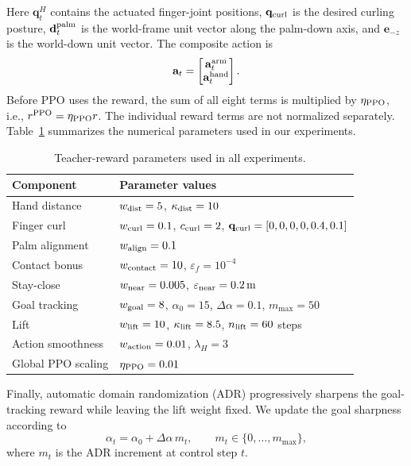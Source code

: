 Here $\mathbf q_t^H$ contains the actuated finger-joint positions,
$\mathbf q_{\rm curl}$ is the desired curling posture,
$\mathbf d_t^{\rm palm}$ is the world-frame unit vector along the palm-down
axis, and $\mathbf e_{-z}$ is the world-down unit vector.  The composite action
is
\begin{equation}
\mathbf a_t=
\begin{bmatrix}\mathbf a_t^{\rm arm}\\ \mathbf a_t^{\rm hand}\end{bmatrix}.
\label{eq:teacher_action_definition}
\end{equation}
Before PPO uses the reward, the sum of all eight terms is multiplied by
$\eta_{\rm PPO}$, i.e., $r^{\rm PPO}=\eta_{\rm PPO}r$. The individual reward
terms are not normalized separately. Table~\ref{tab:teacher_reward_parameters}
summarizes the numerical parameters used in our experiments.

\begin{table}[H]
\centering
\caption{Teacher-reward parameters used in all experiments.}
\label{tab:teacher_reward_parameters}
\renewcommand{\arraystretch}{1.08}
\begin{tabularx}{\textwidth}{@{}lX@{}}
\toprule
Component & Parameter values \\
\midrule
Hand distance & $w_{\rm dist}=5$, $\kappa_{\rm dist}=10$ \\
Finger curl & $w_{\rm curl}=0.1$, $c_{\rm curl}=2$,
$\mathbf q_{\rm curl}=[0,0,0,0,0.4,0.1]$ \\
Palm alignment & $w_{\rm align}=0.1$ \\
Contact bonus & $w_{\rm contact}=10$, $\varepsilon_f=10^{-4}$ \\
Stay-close & $w_{\rm near}=0.005$, $\varepsilon_{\rm near}=0.2\,\mathrm{m}$ \\
Goal tracking & $w_{\rm goal}=8$, $\alpha_0=15$,
$\Delta\alpha=0.1$, $m_{\max}=50$ \\
Lift & $w_{\rm lift}=10$, $\kappa_{\rm lift}=8.5$,
$n_{\rm lift}=60$ steps \\
Action smoothness & $w_{\rm action}=0.01$, $\lambda_H=3$ \\
Global PPO scaling & $\eta_{\rm PPO}=0.01$ \\
\bottomrule
\end{tabularx}
\end{table}

Finally, automatic domain randomization (ADR) progressively sharpens the
goal-tracking reward while leaving the lift weight fixed.  We update the goal
sharpness according to
\begin{equation}
\alpha_t=\alpha_0+\Delta\alpha\,m_t,
\qquad m_t\in\{0,\ldots,m_{\max}\},
\label{eq:teacher_adr_definition}
\end{equation}
where $m_t$ is the ADR increment at control step $t$.

